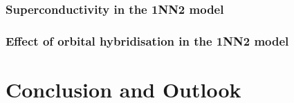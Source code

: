 \documentclass[12pt]{article}
\begin{document}
\subsubsection{Superconductivity in the 1NN2 model}

\subsubsection{Effect of orbital hybridisation in the 1NN2 model}



\section{Conclusion and Outlook}


\newpage


\end{document}
